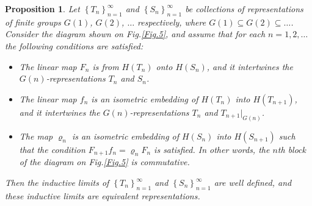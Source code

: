 \documentclass[12pt]{amsart}
\newtheorem{prop}[thm]{Proposition}
\theoremstyle{definition}
\numberwithin{equation}{section}
\begin{document}
\begin{prop}\label{PropositionEqvInd}
Let $\left\{T_n\right\}_{n=1}^{\infty}$ and $\left\{S_n\right\}_{n=1}^{\infty}$ be collections of representations of finite groups $G(1)$, $G(2)$, $\ldots$ respectively, where $G(1)\subseteq G(2)\subseteq\ldots$.
Consider the  diagram shown on Fig.\ref{Fig.5}, and
assume that for each $n=1,2,\ldots$ the following conditions are satisfied:
\begin{itemize}
\item The linear map $F_n$ is from $H\left(T_n\right)$ onto $H\left(S_n\right)$, and it intertwines the $G(n)$-representations $T_n$ and $S_n$.
\item The linear map $f_n$ is an isometric embedding of $H\left(T_n\right)$ into $H\left(T_{n+1}\right)$, and it intertwines  the $G(n)$-representations $T_n$ and $T_{n+1}|_{G(n)}$.
\item The map $\varrho_n$ is an isometric embedding of $H\left(S_n\right)$ into $H\left(S_{n+1}\right)$ such that
the condition $F_{n+1}f_n=\varrho_nF_n$ is satisfied. In other words, the $n$th block of the diagram
on Fig.\ref{Fig.5} is commutative.
\end{itemize}
Then the inductive limits of $\left\{T_n\right\}_{n=1}^{\infty}$ and $\left\{S_n\right\}_{n=1}^{\infty}$ are well defined, and these inductive limits are equivalent representations.
\end{prop}
\end{document}
